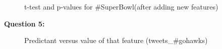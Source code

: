 \documentclass{article}
\begin{document}
\begin{figure}
\centering
{}
\caption{t-test and p-values for \#SuperBowl(after adding new features)} \label{Q4_6}
\end{figure}



\bigbreak
\textbf{Question 5:}

\begin{figure}
\centering
{}
\caption{Predictant versus value of that feature (tweets\_\#gohawks)} \label{Q5_1}
\end{figure}
\end{document}
